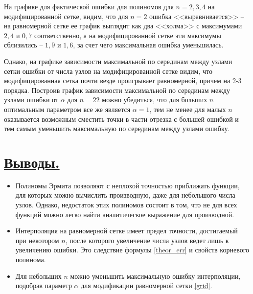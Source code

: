 \documentclass[a4paper, 12pt]{article}
\begin{document}
	На графике для фактической ошибки для полиномов для $n=2,3,4$ на модифицированной сетке, видим, что для $n=2$ ошибка <<выравнивается>> -- на равномерной сетке ее график выглядит как два <<холма>> с максимумами $2,4$ и $0,7$ соответственно, а на модифицированной сетке эти максимумы сблизились -- $1,9$ и $1,6$, за счет чего максимальная ошибка уменьшилась.
	
	Однако, на графике зависимости максимальной по серединам между узлами сетки ошибки от числа узлов на модифицированной сетке видим, что модифицированная сетка почти везде проигрывает равномерной, причем на 2-3 порядка. Построив график зависимости максимальной по серединам между узлами ошибки от $\alpha$ для $n=22$ можно убедиться, что для больших $n$ оптимальным параметром все же является $\alpha=1$, тем не менее для малых $n$ оказывается возможным сместить точки в части отрезка с большей ошибкой и тем самым уменьшить максимальную по серединам между узлами ошибку.
	
	\section{\underline{Выводы.}}
	
	\begin{itemize}
		\item Полиномы Эрмита позволяют с неплохой точностью приближать функции, для которых можно вычислить производную, даже для небольшого числа узлов. Однако, недостаток этих полиномов состоит в том, что не для всех функций можно легко найти аналитическое выражение для производной.
		\item Интерполяция на равномерной сетке имеет предел точности, достигаемый при некотором $n$, после которого увеличение числа узлов ведет лишь к увеличению ошибки. Это следствие формулы \eqref{theor_err} и свойств корневого полинома.
		\item Для небольших $n$ можно уменьшить максимальную ошибку интерполяции, подобрав параметр $\alpha$ для модификации равномерной сетки \eqref{grid}.
	\end{itemize}
	
\end{document}
